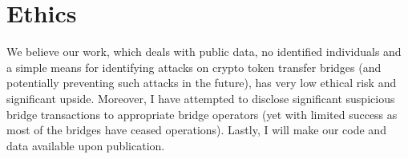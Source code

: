 \section{Ethics}
\label{sec:ethics}

We believe our work, which deals with public data, no identified
individuals and a simple means for identifying attacks on crypto token
transfer bridges (and potentially preventing such attacks in the
future), has very low ethical risk and significant upside. Moreover, I have attempted to disclose significant suspicious bridge
transactions to appropriate bridge operators (yet with limited
success as most of the bridges have ceased operations). Lastly, I will make our code and data available upon publication.
% 






